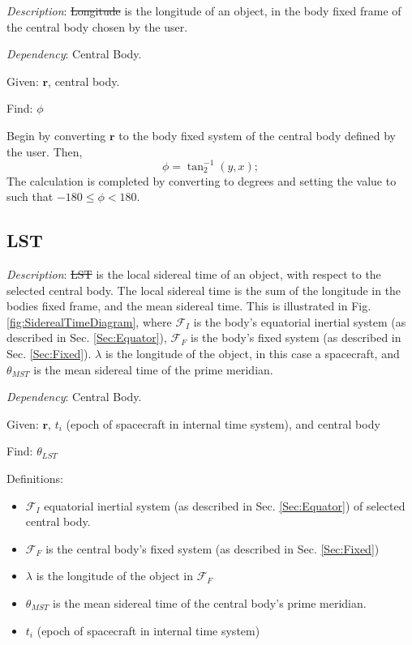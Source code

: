 \noindent \textit{Description}: \st{Longitude} is the longitude of
an object, in the body fixed frame of the central body chosen by the
user.

\noindent \textit{Dependency}:  Central Body.

\noindent Given:  $\mathbf{r}$, central body.

\noindent Find:  $\phi$

Begin by converting $\mathbf{r}$ to the body fixed system of the
central body defined by the user. Then,
%
\begin{equation}
    \phi = \tan_2^{-1}(y,x);
\end{equation}
%
The calculation is completed by converting to degrees and setting
the value to such that $-180 \leq \phi < 180$.

\subsection{LST} 

\noindent \textit{Description}: \st{LST} is the local sidereal time
of an object, with respect to the selected central body.  The local
sidereal time is the sum of the longitude in the bodies fixed frame,
and the mean sidereal time.  This is illustrated in Fig.
\ref{fig:SiderealTimeDiagram}, where $\mathcal{F}_I$ is the body's
equatorial inertial system (as described in Sec. \ref{Sec:Equator}),
$\mathcal{F}_F$ is the body's fixed system (as described in Sec.
\ref{Sec:Fixed}).  $\lambda$ is the longitude of the object, in this
case a spacecraft, and $\theta_{MST}$ is the mean sidereal time of
the prime meridian.

\noindent \textit{Dependency}:  Central Body.

\noindent Given:  $\mathbf{r}$, $t_i$ (epoch of spacecraft in
internal time system), and central body

\noindent Find:  $\theta_{LST}$

\noindent Definitions:
\begin{itemize}
     \item $\mathcal{F}_I$ equatorial inertial system (as described in Sec. \ref{Sec:Equator}) of selected central
     body.
     \item $\mathcal{F}_F$ is the central body's fixed system (as described in Sec. \ref{Sec:Fixed})
     \item $\lambda$ is the longitude of the object in $\mathcal{F}_F$
     \item $\theta_{MST}$ is the mean sidereal time of the central body's  prime meridian.
     \item $t_i$ (epoch of spacecraft in internal time system)
\end{itemize}

